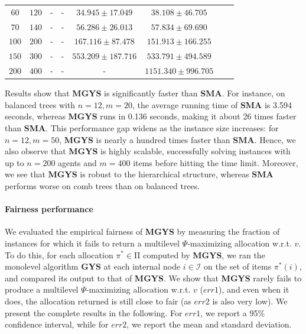 \documentclass[]{article}
\newcommand{\internal}{\mathcal{I}}
\newcommand{\mallocations}{\mathrm{\Pi}}
\begin{document}
\begin{table}[h!]
\begin{tabular}{|c|c|c|c|c|c|c|c|}
      $60$ & $120$  & - & - & $34.945 \pm 17.049$ & $38.108 \pm 46.705$ \\
      $70$ & $140$  & - & - & $56.286 \pm 26.013$ & $57.834 \pm 69.690$ \\
      $100$ & $200$  & - & - & $167.116 \pm 87.478$ & $151.913 \pm 166.255$ \\
      $150$ & $300$  & - & - & $553.209 \pm 187.716$ & $533.791 \pm 494.589$ \\
      $200$ & $400$  & - & - & - & $1151.340 \pm 996.705$ \\
      \hline
    \end{tabular}
    \label{tab: running time}
\end{table}


Results show that \textbf{MGYS} is significantly faster than \textbf{SMA}. For instance, on balanced trees with $n=12, m=20$, the average running time of \textbf{SMA} is 3.594 seconds, whereas \textbf{MGYS} runs in 0.136 seconds, making it about 26 times faster than \textbf{SMA}. This performance gap widens as the instance size increases: for $n=12, m=50$, \textbf{MGYS} is nearly a hundred times faster than \textbf{SMA}.  Hence, we also observe that \textbf{MGYS} is highly scalable, successfully solving instances with up to $n = 200$ agents and $m = 400$ items before hitting the time limit. Moreover, we see that \textbf{MGYS} is robust to the hierarchical structure, whereas \textbf{SMA} performs worse on comb trees than on balanced trees. 


\paragraph{Fairness performance} We evaluated the empirical fairness of \textbf{MGYS} by measuring the fraction of instances for which it fails to return a multilevel $\Psi$-maximizing allocation w.r.t. $v$. To do this, for each allocation $\pi^* \in \mallocations$ computed by \textbf{MGYS}, we ran the monolevel algorithm \textbf{GYS} at each internal node $i \in \internal$ on the set of items $\pi^*(i)$, and compared its output to that of \textbf{MGYS}. We show that \textbf{MGYS} rarely fails to produce a multilevel $\Psi$-maximizing allocation w.r.t. $v$ ($err1$), and even when it does, the allocation returned is still close to fair (as $err2$ is also very low). We present the complete results in the following. For $err1$, we report a 95\% confidence interval, while for $err2$, we report the mean and standard deviation.
\end{document}
